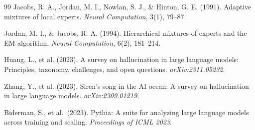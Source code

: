 \documentclass[12pt]{article}
\begin{document}
\begin{thebibliography}{99}
Jacobs, R. A., Jordan, M. I., Nowlan, S. J., \& Hinton, G. E.
(1991). Adaptive mixtures of local experts. \textit{Neural
Computation}, 3(1), 79--87.

Jordan, M. I., \& Jacobs, R. A. (1994). Hierarchical mixtures
of experts and the EM algorithm. \textit{Neural Computation},
6(2), 181--214.

Huang, L., et al. (2023). A survey on hallucination in large
language models: Principles, taxonomy, challenges, and open
questions. \textit{arXiv:2311.05232}.

Zhang, Y., et al. (2023). Siren's song in the AI ocean: A survey
on hallucination in large language models.
\textit{arXiv:2309.01219}.

Biderman, S., et al.\ (2023).
Pythia: A suite for analyzing large language models across training and scaling.
\textit{Proceedings of ICML 2023}.

\end{thebibliography}
\end{document}
